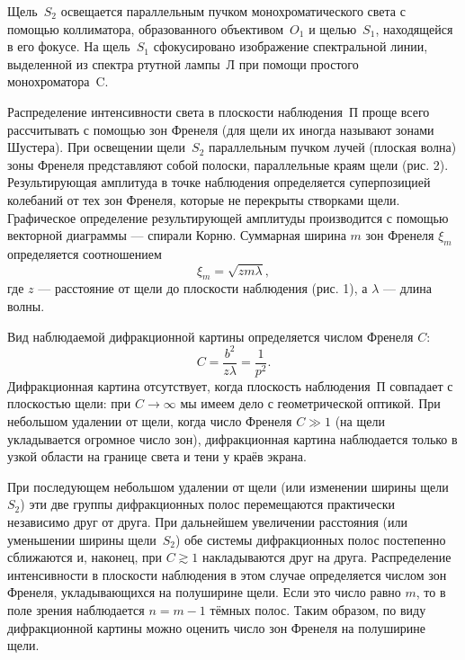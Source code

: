 \documentclass[a4paper, 12pt]{article}
\begin{document}
	Щель~$S_2$ освещается параллельным пучком монохроматического света с помощью коллиматора, образованного объективом~$O_1$ и щелью~$S_1$, находящейся в его фокусе. На щель~$S_1$ сфокусировано изображение спектральной линии, выделенной из спектра ртутной лампы~Л при помощи простого монохроматора~C.


	Распределение интенсивности света в плоскости наблюдения~П проще всего рассчитывать с помощью зон Френеля (для щели их иногда называют зонами Шустера). При освещении щели~$S_2$ параллельным пучком лучей (плоская волна) зоны Френеля представляют собой полоски, параллельные краям щели (рис. 2). Результирующая амплитуда в точке наблюдения определяется суперпозицией колебаний от тех зон Френеля, которые не перекрыты створками щели. Графическое определение результирующей амплитуды производится с помощью векторной диаграммы --- спирали Корню. Суммарная ширина $m$ зон Френеля $\xi_m$ определяется соотношением
	\begin{equation}
		\label{Ширина зон}
	\xi_m=\sqrt{zm\lambda},
	\end{equation}
	где $z$ --- расстояние от щели до плоскости наблюдения (рис. 1), а $\lambda$ --- длина волны.

	Вид наблюдаемой дифракционной картины определяется числом Френеля $C$:
	\begin{equation}
		C = \dfrac{b^2}{z \lambda} = \dfrac{1}{p^2}.
		\label{Число Френеля}
	\end{equation}
	Дифракционная картина отсутствует, когда плоскость наблюдения~П совпадает с плоскостью щели: при $C \rightarrow \infty$ мы имеем дело с геометрической оптикой. При небольшом удалении от щели, когда число Френеля $C \gg 1$ (на щели укладывается огромное число зон), дифракционная картина наблюдается только в узкой области на границе света и тени у краёв экрана.

	При последующем небольшом удалении от щели (или изменении ширины щели $S_2$) эти две группы дифракционных полос перемещаются практически независимо друг от друга. При дальнейшем увеличении расстояния (или уменьшении ширины щели~$S_2$) обе системы дифракционных полос постепенно сближаются и, наконец, при $C \gtrsim 1$ накладываются друг на друга. Распределение интенсивности в плоскости наблюдения в этом случае определяется числом зон Френеля, укладывающихся на полуширине щели. Если это число равно $m$, то в поле зрения наблюдается $n=m-1$ тёмных полос. Таким образом, по виду дифракционной картины можно оценить число зон Френеля на полуширине щели.
\end{document}
